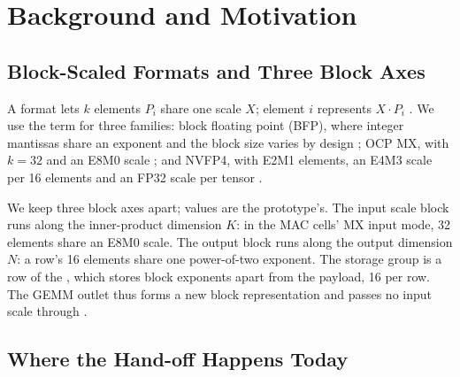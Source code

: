 
\section{Background and Motivation}\label{sec:background}

\subsection{Block-Scaled Formats and Three Block Axes}\label{sec:bg-formats}

%
A \blockscaled format lets $k$ elements $P_i$ share one scale $X$; element $i$ represents $X \cdot P_i$ \cite{OCP2023MXSpec}.
We use the term for three families: block floating point (BFP), where integer mantissas share an exponent and the block size varies by design \cite{Fowers2018Brainwave,Drumond2018HBFP,DarvishRouhani2020MSFP}; OCP MX, with $k=32$ and an E8M0 scale \cite{OCP2023MXSpec,DarvishRouhani2023MXFormats}; and NVFP4, with E2M1 elements, an E4M3 scale per 16 elements and an FP32 scale per tensor \cite{NVIDIA2025NVFP4Blog}.

%
We keep three block axes apart; values are the prototype's.
The input scale block runs along the inner-product dimension $K$: in the MAC cells' MX input mode, 32 elements share an E8M0 scale.
The output block runs along the output dimension $N$: a row's 16 elements share one power-of-two exponent.
The storage group is a row of the \sidecar, which stores block exponents apart from the payload, 16 per row.
The GEMM outlet thus forms a new block representation and passes no input scale through .

\subsection{Where the Hand-off Happens Today}\label{sec:bg-today}

